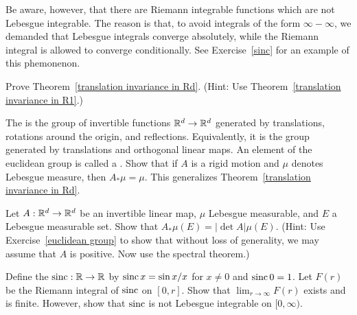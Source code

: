 Be aware, however, that there are Riemann integrable functions which are not Lebesgue integrable.
The reason is that, to avoid integrals of the form $\infty - \infty$, we demanded that Lebesgue integrals converge absolutely, while the Riemann integral is allowed to converge conditionally.
See Exercise~\ref{sinc} for an example of this phemonenon.

\begin{exercise}
\label{translation invariance exer}
Prove Theorem~\ref{translation invariance in Rd}. (Hint: Use Theorem~\ref{translation invariance in R1}.)
\end{exercise}

\begin{exercise}
\label{euclidean group}
The  is the group of invertible functions $\mathbb{R}^{d} \to \mathbb{R}^d$ generated by translations, rotations around the origin, and reflections. Equivalently, it is the group generated by translations and orthogonal linear maps.
An element of the euclidean group is called a . Show that if $A$ is a rigid motion and $\mu$ denotes Lebesgue measure, then $A_*\mu = \mu$.
This generalizes Theorem~\ref{translation invariance in Rd}.
\end{exercise}

\begin{exercise}
Let $A: \mathbb{R}^{d} \to \mathbb{R}^d$ be an invertible linear map, $\mu$ Lebesgue measurable, and $E$ a Lebesgue measurable set. Show that $A_*\mu(E) = |\det A|\mu(E)$.
(Hint: Use Exercise~\ref{euclidean group} to show that without loss of generality, we may assume that $A$ is positive. Now use the spectral theorem.)
\end{exercise}

\begin{exercise}
\label{sinc}
Define the  $\operatorname{sinc}: \mathbb{R} \to \mathbb{R}$ by $\operatorname{sinc} x = \sin x/x$ for $x \neq 0$ and $\operatorname{sinc} 0 = 1$.
Let $F(r)$ be the Riemann integral of $\operatorname{sinc}$ on $[0, r]$. Show that $\lim_{r \to \infty} F(r)$ exists and is finite.
However, show that $\operatorname{sinc}$ is not Lebesgue integrable on $[0, \infty)$.
\end{exercise}

